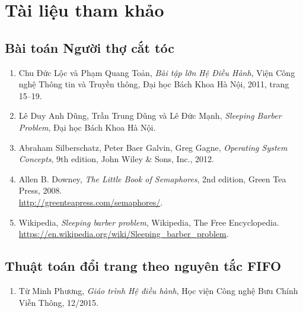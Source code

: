 
\chapter{Tài liệu tham khảo}
\label{Chapter5}

\section*{Bài toán Người thợ cắt tóc}

\begin{enumerate}
    \item Chu Đức Lộc và Phạm Quang Toản, \textit{Bài tập lớn Hệ Điều Hành}, Viện Công nghệ Thông tin và Truyền thông, Đại học Bách Khoa Hà Nội, 2011, trang 15–19.
    \item Lê Duy Anh Dũng, Trần Trung Dũng và Lê Đức Mạnh, \textit{Sleeping Barber Problem}, Đại học Bách Khoa Hà Nội.
    \item Abraham Silberschatz, Peter Baer Galvin, Greg Gagne, \textit{Operating System Concepts}, 9th edition, John Wiley \& Sons, Inc., 2012.
    \item Allen B. Downey, \textit{The Little Book of Semaphores}, 2nd edition, Green Tea Press, 2008.\\
    \url{http://greenteapress.com/semaphores/}.
    \item Wikipedia, \textit{Sleeping barber problem}, Wikipedia, The Free Encyclopedia.\\
    \url{https://en.wikipedia.org/wiki/Sleeping_barber_problem}.
\end{enumerate}

\section*{Thuật toán đổi trang theo nguyên tắc FIFO}

\begin{enumerate}
    \item Từ Minh Phương, \textit{Giáo trình Hệ điều hành}, Học viện Công nghệ Bưu Chính Viễn Thông, 12/2015.
\end{enumerate}